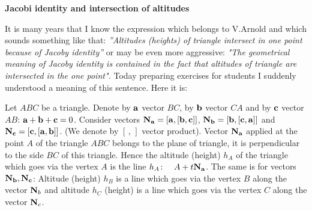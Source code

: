 \def\vare {\varepsilon}
\def\A {{\bf A}}
\def\t {\tilde}
\def\a {\alpha}
\def\K {{\bf K}}
\def\N {{\bf N}}
\def\V {{\cal V}}
\def\s {{\sigma}}
\def\S {{\Sigma}}
\def\s {{\sigma}}
\def\p{\partial}
\def\vare{{\varepsilon}}
\def\Q {{\bf Q}}
\def\D {{\cal D}}
\def\G {{\Gamma}}
\def\C {{\bf C}}
\def\M {{\cal M}}
\def\Z {{\bf Z}}
\def\U  {{\cal U}}
\def\H {{\cal H}}
\def\R  {{\bf R}}
\def\E  {{\bf E}}
\def\l {\lambda}
\def\degree {{\bf {\rm degree}\,\,}}
\def \finish {${\,\,\vrule height1mm depth2mm width 8pt}$}
\def \m {\medskip}
\def\p {\partial}
\def\r {{\bf r}}
\def\v {{\bf v}}
\def\n {{\bf n}}
\def\t {{\bf t}}
\def\b {{\bf b}}
\def\c {{\bf c }}
\def\e{{\bf e}}
\def\ac {{\bf a}}
\def \X   {{\bf X}}
\def \Y   {{\bf Y}}
\def \x   {{\bf x}}
\def \y   {{\bf y}}

\centerline  {\bf  Jacobi identity and intersection of altitudes}

\bigskip

  It is many years that I know the expression 
which belongs to V.Arnold and which sounds something like
  that: {\sl ''Altitudes (heights) of triangle intersect in 
one point because of Jacoby identity''}
  or may be even more aggressive: 
{\sl "The geometrical meaning of Jacoby identity 
is contained in the fact that
    altitudes of triangle are intersected in the one point".}
  Today preparing exercises for students I suddenly understood a 
meaning of this sentence. Here it is:

\m

  Let $ABC$ be a triangle. Denote by $\ac$ vector $BC$, 
by $\b$ vector $CA$ and by $\c$ vector $AB$:
  $\ac+\b+\c=0$.
   Consider vectors $\N_{\ac}=[\ac,[\b,\c]]$, 
$\N_{\b}=[\b,[\c,\ac]]$ and $\N_{\c}=[\c,[\ac,\b]]$.
(We denote by $[\,,\,]$ vector product).
   Vector $\N_{\ac}$ applied at the point $A$ of the 
triangle $ABC$ belongs to the plane of triangle, it
   is perpendicular to
   the side $BC$ of this triangle.  Hence the altitude (height) 
$h_A$ of the triangle
    which goes via the vertex $A$
   is the line $h_A\colon\quad A+t\N_{\ac}$. 
The same is for vectors $\N_\b,\N_\c$:
    Altitude (height) $h_B$ is a line which goes via 
the vertex $B$ along the vector $\N_b$ and
    altitude $h_C$ (height) is a line which goes via the vertex $C$ along the vector $\N_c$.


